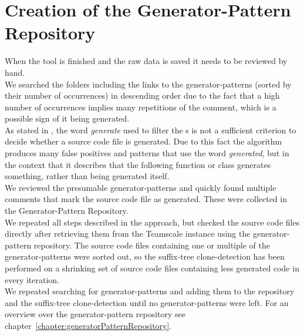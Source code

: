 \section{Creation of the Generator-Pattern Repository}
When the tool is finished and the raw data is saved it needs to be reviewed by hand. \\
We searched the folders including the links to the generator-patterns (sorted by their number of occurrences) in descending order due to the fact that a high number of occurrences implies many repetitions of the comment, which is a possible sign of it being generated.\\
As stated in \cite{Bernwieser2014}, the word \textit{generate} used to filter the s is not a sufficient criterion to decide whether a source code file is generated. Due to this fact the algorithm produces many false positives and patterns that use the word \textit{generated}, but in the context that it describes that the following function or class generates something, rather than being generated itself. \\
We reviewed the presumable generator-patterns and quickly found multiple comments that mark the source code file as generated. These were collected in the Generator-Pattern Repository.\\
We repeated all steps described in the approach, but checked the source code files directly after retrieving them from the Teamscale instance using the generator-pattern repository. The source code files containing one or multiple of the generator-patterns were sorted out, so the suffix-tree clone-detection has been performed on a shrinking set of source code files containing less generated code in every iteration.\\
We repeated searching for generator-patterns and adding them to the repository and the suffix-tree clone-detection until no generator-patterns were left.
For an overview over the generator-pattern repository see chapter~\ref{chapter:generatorPatternRepository}.










